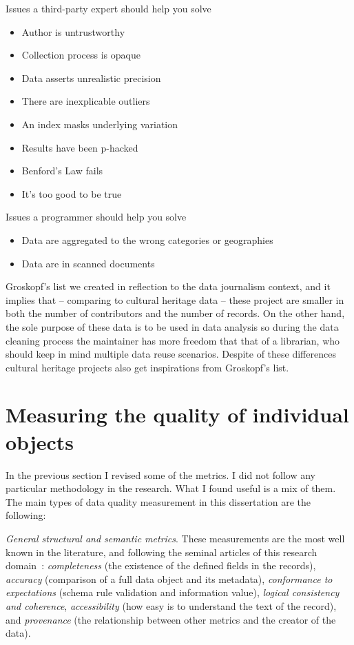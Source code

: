 Issues a third-party expert should help you solve
\begin{itemize}
 \setlength{\parskip}{0pt}
 \setlength{\itemsep}{0pt plus 1pt}
 \item Author is untrustworthy
 \item Collection process is opaque
 \item Data asserts unrealistic precision
 \item There are inexplicable outliers
 \item An index masks underlying variation
 \item Results have been p-hacked
 \item Benford’s Law fails
 \item It’s too good to be true
\end{itemize}

Issues a programmer should help you solve
\begin{itemize}
 \setlength{\parskip}{0pt}
 \setlength{\itemsep}{0pt plus 1pt}
 \item Data are aggregated to the wrong categories or geographies
 \item Data are in scanned documents
\end{itemize}

Groskopf's list we created in reflection to the data journalism context, and it implies that -- comparing to cultural heritage data -- these  project are smaller in both the number of contributors and the number of records. On the other hand, the sole purpose of these data is to be used in data analysis so during the data cleaning process the maintainer has more freedom that that of a librarian, who should keep in mind multiple data reuse scenarios. Despite of these differences cultural heritage projects also get inspirations from Groskopf's list.

\section{Measuring the quality of individual objects}

In the previous section I revised some of the metrics. I did not follow any particular methodology in the research. What I found useful is a mix of them. The main types of data quality measurement in this dissertation are the following:

\emph{General structural and semantic metrics}. These measurements are the most well known in the literature, and following the seminal articles of this research domain~\cite{bruce-hillmann2004, ochoa-duval2009}: \emph{completeness} (the existence of the defined fields in the records), \emph{accuracy} (comparison of a full data object and its metadata), \emph{conformance to expectations} (schema rule validation and information value), \emph{logical consistency and coherence}, \emph{accessibility} (how easy is to understand the text of the record), and \emph{provenance} (the relationship between other metrics and the creator of the data).

